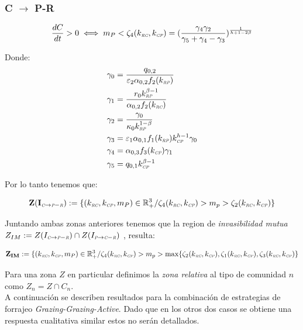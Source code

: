 \subsubsection{C $\to$ P-R}
\begin{equation}
  \frac{dC}{dt}  >0 \iff m_P < \zeta_4(k_{\textit{\tiny RC}},k_{\textit{\tiny CP}}) = (\frac{\gamma_4\gamma_2}{\gamma_5 + \gamma_4 - \gamma_3})^{\frac{1}{h + 1 - 2\beta}}
\end{equation}

Donde:
\begin{equation}
  \begin{aligned}
    \gamma_0 &= \frac{q_{0,2}}{\varepsilon_2 \alpha_{0,2} f_2(k_{\textit{\tiny RP}})}\\
    \gamma_1 &= \frac{r_0 k_{\textit{\tiny RP}}^{\beta -1}}{\alpha_{0,2} f_2(k_{\textit{\tiny RC}})}\\
    \gamma_2 &= \frac{\gamma_0}{\kappa_0 k_{\textit{\tiny RP}}^{1-\beta}} \\
    \gamma_3 &= \varepsilon_1\alpha_{0,1} f_1(k_{\textit{\tiny RP}}) k_{\textit{\tiny CP}}^{h -1} \gamma_0\\
    \gamma_4 &=\alpha_{0,3} f_3(k_{\textit{\tiny CP}}) \gamma_1 \\
    \gamma_5 &= q_{0,1} k_{\textit{\tiny CP}}^{\beta-1}
  \end{aligned}
\end{equation}

Por lo tanto tenemos que:

\begin{equation}
\mathbf{Z(I_{\textit{\tiny C} \to \textit{\tiny P}-\textit{\tiny R}})} := \{ (k_{\textit{\tiny RC}},k_{\textit{\tiny CP}},m_P) \in \mathbb{R}^3_+ / \zeta_4(k_{\textit{\tiny RC}},k_{\textit{\tiny CP}}) > m_p > \zeta_2(k_{\textit{\tiny RC}},k_{\textit{\tiny CP}}) \}
\end{equation}

Juntando ambas zonas anteriores tenemos que la region de \emph{invasibilidad mutua} $Z_{IM} := Z(I_{\textit{\tiny C} \to \textit{\tiny P}-\textit{\tiny R}}) \cap Z(I_{\textit{\tiny P} \to \textit{\tiny C}-\textit{\tiny R}})$ , resulta:


\begin{equation}
\mathbf{Z_{IM}} := \{ (k_{\textit{\tiny RC}},k_{\textit{\tiny CP}},m_P) \in \mathbb{R}^3_+ / \zeta_4(k_{\textit{\tiny RC}},k_{\textit{\tiny CP}}) > m_p > \max \{ \zeta_2(k_{\textit{\tiny RC}},k_{\textit{\tiny CP}}) , \zeta_1(k_{\textit{\tiny RC}},k_{\textit{\tiny CP}}) , \zeta_3(k_{\textit{\tiny RC}},k_{\textit{\tiny CP}}) \}
\end{equation}



Para una zona $Z$ en particular definimos la \emph{zona relativa} al tipo de comunidad $n$ como $Z_n = Z \cap C_n$. \\
A continuaci\'on se describen resultados para la combinaci\'on de estrategias de forrajeo \emph{Grazing-Grazing-Active}. Dado que en los otros dos casos se obtiene una respuesta cualitativa similar estos no ser\'an detallados.






